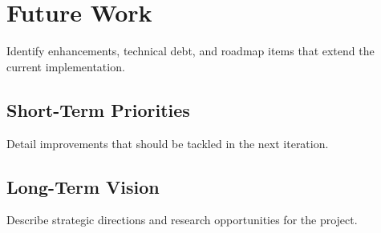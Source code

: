 \section{Future Work}

Identify enhancements, technical debt, and roadmap items that extend the current implementation.

\subsection{Short-Term Priorities}
Detail improvements that should be tackled in the next iteration.

\subsection{Long-Term Vision}
Describe strategic directions and research opportunities for the project.
